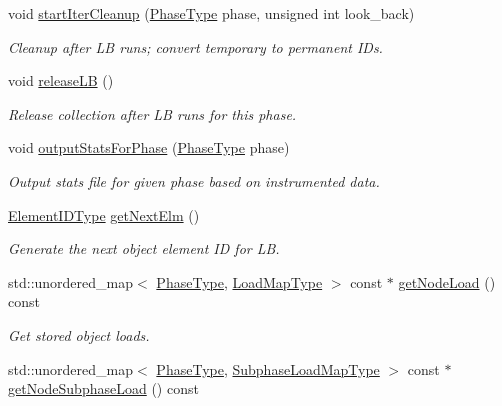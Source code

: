 \begin{DoxyCompactItemize}
void \hyperlink{structvt_1_1vrt_1_1collection_1_1balance_1_1_node_stats_ae76790d41701769b86ef15e4924d661d}{start\+Iter\+Cleanup} (\hyperlink{namespacevt_a46ce6733d5cdbd735d561b7b4029f6d7}{Phase\+Type} phase, unsigned int look\+\_\+back)
\begin{DoxyCompactList}\small\item\em Cleanup after LB runs; convert temporary to permanent I\+Ds. \end{DoxyCompactList}\item 
void \hyperlink{structvt_1_1vrt_1_1collection_1_1balance_1_1_node_stats_a517e67b5ada69873ab40d5f6e007a818}{release\+LB} ()
\begin{DoxyCompactList}\small\item\em Release collection after LB runs for this phase. \end{DoxyCompactList}\item 
void \hyperlink{structvt_1_1vrt_1_1collection_1_1balance_1_1_node_stats_aa6e33fd5ae9275515557ada40ef3d489}{output\+Stats\+For\+Phase} (\hyperlink{namespacevt_a46ce6733d5cdbd735d561b7b4029f6d7}{Phase\+Type} phase)
\begin{DoxyCompactList}\small\item\em Output stats file for given phase based on instrumented data. \end{DoxyCompactList}\item 
\hyperlink{namespacevt_1_1vrt_1_1collection_1_1balance_a14c8d2c972f2913aa3f1636e5be0a120}{Element\+I\+D\+Type} \hyperlink{structvt_1_1vrt_1_1collection_1_1balance_1_1_node_stats_ac1b800713117d8f017746985a66dfbd2}{get\+Next\+Elm} ()
\begin{DoxyCompactList}\small\item\em Generate the next object element ID for LB. \end{DoxyCompactList}\item 
std\+::unordered\+\_\+map$<$ \hyperlink{namespacevt_a46ce6733d5cdbd735d561b7b4029f6d7}{Phase\+Type}, \hyperlink{namespacevt_1_1vrt_1_1collection_1_1balance_a45306ee4bf38fe3fb586d1ee2fa3d147}{Load\+Map\+Type} $>$ const  $\ast$ \hyperlink{structvt_1_1vrt_1_1collection_1_1balance_1_1_node_stats_a5b34d26f9e10f7ff3ceb92b95f0ed2f6}{get\+Node\+Load} () const
\begin{DoxyCompactList}\small\item\em Get stored object loads. \end{DoxyCompactList}\item 
std\+::unordered\+\_\+map$<$ \hyperlink{namespacevt_a46ce6733d5cdbd735d561b7b4029f6d7}{Phase\+Type}, \hyperlink{namespacevt_1_1vrt_1_1collection_1_1balance_a3d91523158c1025b7b665240072f3b7e}{Subphase\+Load\+Map\+Type} $>$ const  $\ast$ \hyperlink{structvt_1_1vrt_1_1collection_1_1balance_1_1_node_stats_a24660f52ff5e6a734a443ebbd1852519}{get\+Node\+Subphase\+Load} () const

\end{DoxyCompactItemize}
